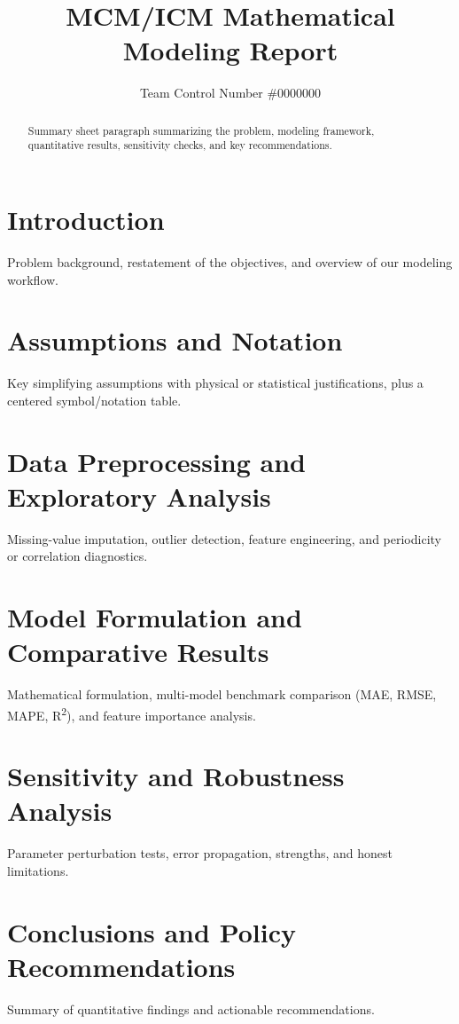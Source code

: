 \documentclass[12pt,letterpaper]{article}
\title{MCM/ICM Mathematical Modeling Report}
\author{Team Control Number \#0000000}
\date{}
\begin{document}
\maketitle

\begin{abstract}
Summary sheet paragraph summarizing the problem, modeling framework, quantitative results, sensitivity checks, and key recommendations.
\end{abstract}

\newpage

\section{Introduction}
Problem background, restatement of the objectives, and overview of our modeling workflow.

\section{Assumptions and Notation}
Key simplifying assumptions with physical or statistical justifications, plus a centered symbol/notation table.

\section{Data Preprocessing and Exploratory Analysis}
Missing-value imputation, outlier detection, feature engineering, and periodicity or correlation diagnostics.

\section{Model Formulation and Comparative Results}
Mathematical formulation, multi-model benchmark comparison (MAE, RMSE, MAPE, R\textsuperscript{2}), and feature importance analysis.

\section{Sensitivity and Robustness Analysis}
Parameter perturbation tests, error propagation, strengths, and honest limitations.

\section{Conclusions and Policy Recommendations}
Summary of quantitative findings and actionable recommendations.



\end{document}
